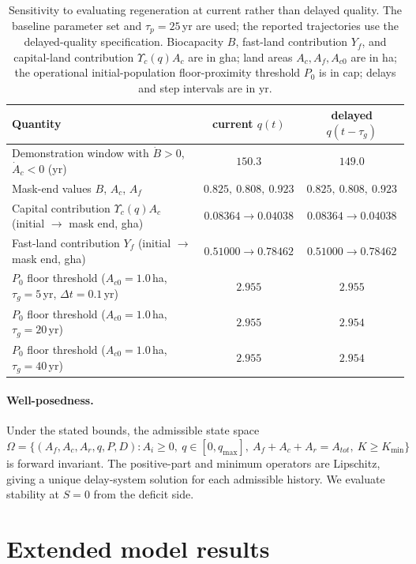 \documentclass[11pt,a4paper]{article}
\newcommand{\Ups}{\Upsilon_c}
\begin{document}
\begin{table}[htbp]
\centering\small
\caption{Sensitivity to evaluating regeneration at current rather than delayed quality. The baseline parameter set and $\tau_p=25$\,yr are used; the reported trajectories use the delayed-quality specification. Biocapacity $B$, fast-land contribution $Y_f$, and capital-land contribution $\Ups(q)A_c$ are in gha; land areas $A_c,A_f,A_{c0}$ are in ha; the operational initial-population floor-proximity threshold $P_0$ is in cap; delays and step intervals are in yr.}
\label{tab:si_delay}
\begin{tabularx}{\textwidth}{>{\raggedright\arraybackslash}Xcc}
\toprule
Quantity & current $q(t)$ & delayed $q(t-\tau_g)$ \\
\midrule
Demonstration window with $\dot B>0$, $\dot A_c<0$ (yr) & $150.3$ & $149.0$ \\
Mask-end values $B$, $A_c$, $A_f$ & $0.825,\ 0.808,\ 0.923$ & $0.825,\ 0.808,\ 0.923$ \\
Capital contribution $\Ups(q)A_c$ (initial $\to$ mask end, gha) & $0.08364\to0.04038$ & $0.08364\to0.04038$ \\
Fast-land contribution $Y_f$ (initial $\to$ mask end, gha) & $0.51000\to0.78462$ & $0.51000\to0.78462$ \\
$P_0$ floor threshold ($A_{c0}=1.0$\,ha, $\tau_g=5$\,yr, $\Delta t=0.1$\,yr) & $2.955$ & $2.955$ \\
$P_0$ floor threshold ($A_{c0}=1.0$\,ha, $\tau_g=20$\,yr) & $2.955$ & $2.954$ \\
$P_0$ floor threshold ($A_{c0}=1.0$\,ha, $\tau_g=40$\,yr) & $2.955$ & $2.954$ \\
\bottomrule
\end{tabularx}
\end{table}

\paragraph{Well-posedness.} Under the stated bounds, the admissible state space $\Omega=\{(A_f,A_c,A_r,q,P,D):A_i\ge0,\ q\in[0,q_{\max}],\ A_f+A_c+A_r=A_{tot},\ K\ge K_{\min}\}$ is forward invariant. The positive-part and minimum operators are Lipschitz, giving a unique delay-system solution for each admissible history. We evaluate stability at $S=0$ from the deficit side.

\section{Extended model results}\label{si:results}
\end{document}
